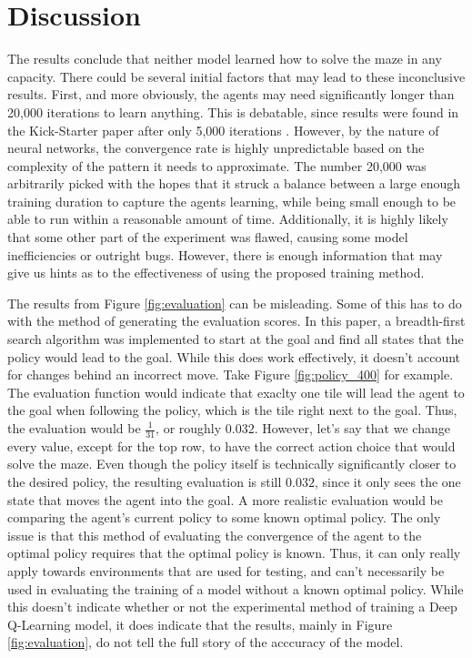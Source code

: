 \documentclass[12pt,letterpaper]{article}
\begin{document}
\section{Discussion}

The results conclude that neither model learned how to solve the maze in any capacity.
There could be several initial factors that may lead to these inconclusive results.
First, and more obviously, the agents may need significantly longer than 20,000 iterations to learn anything.
This is debatable, since results were found in the Kick-Starter paper after only 5,000 iterations \cite{article_kickstart_deep_reinforcement_learning}.
However, by the nature of neural networks, the convergence rate is highly unpredictable based on the complexity of the pattern it needs to approximate.
The number 20,000 was arbitrarily picked with the hopes that it struck a balance between a large enough training duration to capture the agents learning, while being small enough to be able to run within a reasonable amount of time.
Additionally, it is highly likely that some other part of the experiment was flawed, causing some model inefficiencies or outright bugs.
However, there is enough information that may give us hints as to the effectiveness of using the proposed training method.

The results from Figure \ref{fig:evaluation} can be misleading.
Some of this has to do with the method of generating the evaluation scores.
In this paper, a breadth-first search algorithm was implemented to start at the goal and find all states that the policy would lead to the goal.
While this does work effectively, it doesn't account for changes behind an incorrect move.
Take Figure \ref{fig:policy_400} for example.
The evaluation function would indicate that exaclty one tile will lead the agent to the goal when following the policy, which is the tile right next to the goal.
Thus, the evaluation would be $\frac{1}{31}$, or roughly $0.032$.
However, let's say that we change every value, except for the top row, to have the correct action choice that would solve the maze.
Even though the policy itself is technically significantly closer to the desired policy, the resulting evaluation is still $0.032$, since it only sees the one state that moves the agent into the goal.
A more realistic evaluation would be comparing the agent's current policy to some known optimal policy.
The only issue is that this method of evaluating the convergence of the agent to the optimal policy requires that the optimal policy is known.
Thus, it can only really apply towards environments that are used for testing, and can't necessarily be used in evaluating the training of a model without a known optimal policy.
While this doesn't indicate whether or not the experimental method of training a Deep Q-Learning model, it does indicate that the results, mainly in Figure \ref{fig:evaluation}, do not tell the full story of the acccuracy of the model.
\end{document}
